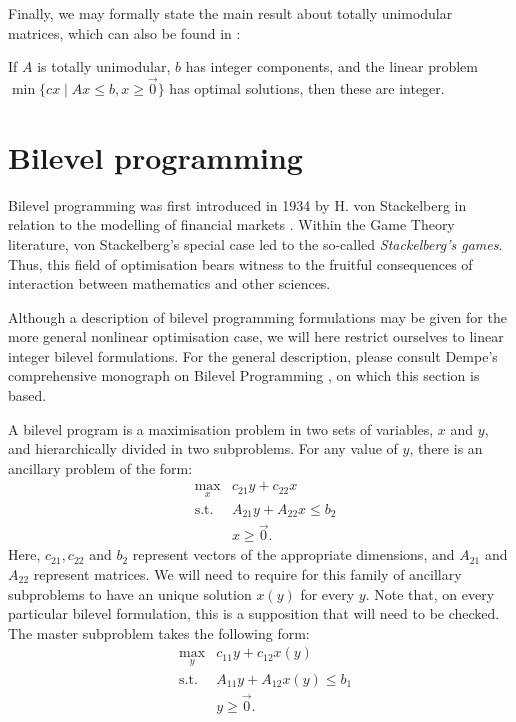 Finally, we may formally state the main result about totally unimodular
matrices, which can also be found in \cite{ne:opt}:

\begin{proposition}
    If $A$ is totally unimodular, $b$ has integer components, and the linear
    problem
    $
        \min\{
            cx \mid Ax \leq b, x \geq \vec{0}
        \}
    $
    has optimal solutions, then these are integer.
\end{proposition}

\section{Bilevel programming} %
\label{sec:int:bilevel-programming}

Bilevel programming was first introduced in 1934 by H. von Stackelberg in
relation to the modelling of financial markets \cite{sa:marktform}. Within the
Game Theory literature, von Stackelberg's special case led to the so-called
\emph{Stackelberg's games}. Thus, this field of optimisation bears witness to
the fruitful consequences of interaction between mathematics and other sciences.

Although a description of bilevel programming formulations may be given for the
more general nonlinear optimisation case, we will here restrict ourselves to
linear integer bilevel formulations. For the general description, please consult
Dempe's comprehensive monograph on Bilevel Programming \cite{de:foundations}, on
which this section is based.

A bilevel program is a maximisation problem in two sets of variables, $x$ and
$y$, and hierarchically divided in two subproblems. For any value of $y$, there
is an ancillary problem of the form:
\begin{eqnarray*}
    &\max_x      & c_{21} y + c_{22} x         \\
    &\mbox{s.t.} & A_{21} y + A_{22} x \leq b_2\\
    &            &                   x \geq \vec{0}.
\end{eqnarray*}
Here, $c_{21}, c_{22}$ and $b_2$ represent vectors of the appropriate
dimensions, and $A_{21}$ and $A_{22}$ represent matrices. We will need to
require for this family of ancillary subproblems to have an unique solution
$x(y)$ for every $y$.
Note that, on every particular bilevel formulation, this is a supposition that
will need to be checked. The master subproblem takes the following form:
\begin{eqnarray*}
    &\max_y     & c_{11} y + c_{12} x(y)         \\
    &\mbox{s.t.}& A_{11} y + A_{12} x(y) \leq b_1\\
    &           &        y               \geq \vec{0}.
\end{eqnarray*}

